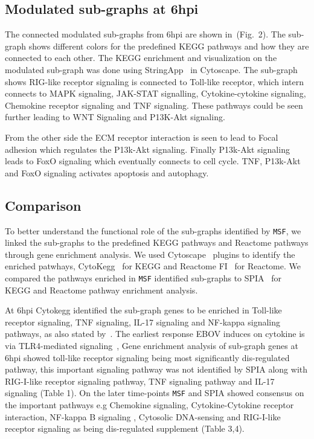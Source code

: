 \documentclass[twocolumn]{article}
\begin{document}
\subsection*{Modulated sub-graphs at 6hpi}

The connected modulated sub-graphs from 6hpi are shown in~(Fig.~2). The sub-graph shows different colors for the predefined  KEGG pathways and how they are connected to each other. The KEGG enrichment and visualization on the modulated sub-graph was done using StringApp~\cite{StringApp} in Cytoscape. The sub-graph shows RIG-like receptor signaling is connected to Toll-like receptor, which intern connects to MAPK signaling, JAK-STAT signalling, Cytokine-cytokine signaling, Chemokine receptor signaling and TNF signaling. These pathways could be seen further leading to WNT Signaling and P13K-Akt signaling.

From the other side the ECM receptor interaction is seen to lead to Focal adhesion which regulates the P13k-Akt signaling. Finally P13k-Akt signaling leads to FoxO signaling which eventually connects to cell cycle. TNF, P13k-Akt and FoxO signaling activates apoptosis and autophagy.

\subsection*{Comparison} 

To better understand the functional role of the sub-graphs identified by \texttt{MSF}, we linked the  sub-graphs to the predefined KEGG pathways and Reactome
pathways through gene enrichment analysis. We used Cytoscape~\cite{Cyto} plugins to identify the enriched patwhays, CytoKegg~\cite{Cytokegg} for KEGG and Reactome FI~\cite{Reactome} for Reactome. We compared the pathways enriched in \texttt{MSF} identified sub-graphs to SPIA~\cite{Tarca} for KEGG and Reactome pathway enrichment analysis. 

At 6hpi Cytokegg identified the sub-graph genes to be enriched in Toll-like receptor signaling, TNF signaling, IL-17 signaling and NF-kappa signaling pathways, as also stated by~\cite{Olejnik}. The earliest response EBOV induces on  cytokine is via TLR4-mediated signaling~\cite{Olejnik}, Gene enrichment analysis of sub-graph genes at 6hpi showed toll-like receptor signaling being most significantly dis-regulated pathway, this important signaling pathway was not identified by SPIA along with RIG-I-like receptor signaling pathway, TNF signaling pathway and IL-17 signaling (Table 1). 
On the later time-points \texttt{MSF} and SPIA showed consensus on the important pathways e.g Chemokine signaling, Cytokine-Cytokine receptor interaction, NF-kappa B signaling , Cytosolic DNA-sensing and RIG-I-like receptor signaling as being dis-regulated supplement (Table 3,4). 
\end{document}
